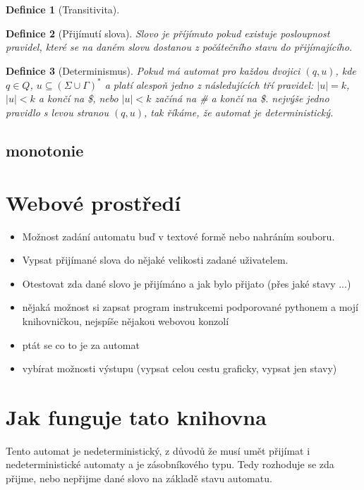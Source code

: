 \documentclass{article}
\newtheorem{theorem}{Definice}
\begin{document}
\begin{theorem}[Transitivita]
	
\end{theorem}

\begin{theorem}[Přijímutí slova]
	Slovo je příjímuto pokud existuje posloupnost pravidel, které se na daném slovu dostanou z počátečního stavu do přijímajícího.


\end{theorem}


\begin{theorem}[Determinismus]
Pokud má automat pro každou dvojici $(q, u)$, kde $q \in Q$, $u \subseteq (\Sigma \cup \Gamma)^*$ a platí alespoň jedno z následujících tří pravidel:
$|u| = k$, $|u| < k$ a končí na \$, nebo $|u| < k$ začíná na \# a končí na \$.
nejvýše jedno pravidlo s levou stranou $(q, u)$, tak říkáme, že automat je deterministický.
\end{theorem}

\subsection{monotonie}



\section{Webové prostředí}
\begin{itemize}
	\item Možnost zadání automatu buď v textové formě nebo nahráním souboru.
	\item Vypsat přijímané slova do nějaké velikosti zadané uživatelem.
	\item Otestovat zda dané slovo je přijímáno a jak bylo přijato (přes jaké stavy ...)
	\item nějaká možnost si zapsat program instrukcemi podporované pythonem a mojí knihovničkou, nejspíše nějakou webovou konzolí
	\item ptát se co to je za automat
	\item vybírat možnosti výstupu (vypsat celou cestu graficky, vypsat jen stavy)
\end{itemize}

\section{Jak funguje tato knihovna}

Tento automat je nedeterministický, z důvodů že musí umět přijímat i nedeterministické automaty
a je zásobníkového typu.
Tedy rozhoduje se zda přijme, nebo nepřijme dané slovo na základě stavu automatu.
\end{document}
